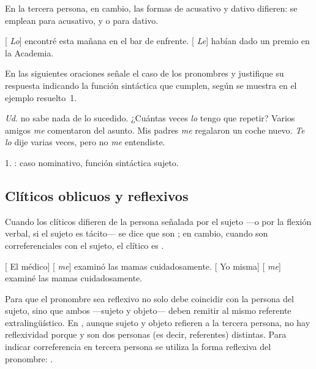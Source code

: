 En la tercera persona, en cambio, las formas de acusativo y dativo difieren: se
emplean  para acusativo, y  o  para
dativo.

\begin{exe}
  \ex {}[ \textit{Lo}] encontré esta mañana en el bar de enfrente.
  \ex {}[ \textit{Le}] habían dado un premio en la Academia.
\end{exe}

\begin{ejercicio}\label{ej:10-caso}
En las siguientes oraciones señale el caso de los pronombres y justifique su
respuesta indicando la función sintáctica que cumplen, según se muestra en el
ejemplo resuelto~1.

\begin{exe}
  \ex \textit{Ud.} no sabe nada de lo sucedido.
  \ex ¿Cuántas veces \textit{lo} tengo que repetir?
  \ex Varios amigos \textit{me} comentaron del asunto.
  \ex Mis padres \textit{me} regalaron un coche nuevo.
  \ex \textit{Te lo} dije varias veces, pero no \textit{me} entendiste.
\end{exe}

\begin{resuelto}
1. : caso nominativo, función sintáctica sujeto.
\end{resuelto}
\end{ejercicio}

\subsection{Clíticos oblicuos y reflexivos}\label{sec:10-oblicuos}

Cuando los clíticos difieren de la persona señalada por el sujeto ---o por la
flexión verbal, si el sujeto es tácito--- se dice que son 
; en cambio, cuando son correferenciales con el sujeto, el
clítico es  .

\begin{exe}
  \ex\label{ex:10-medico} {}[ El médico] [
      \textit{me}] examinó las mamas cuidadosamente.
  \ex\label{ex:10-yomisma} {}[ Yo misma] [
      \textit{me}] examiné las mamas cuidadosamente.
\end{exe}

Para que el pronombre sea reflexivo no solo debe coincidir con la persona del
sujeto, sino que ambos ---sujeto y objeto--- deben remitir al mismo referente
extralingüístico. En , aunque sujeto y objeto refieren a
la tercera persona, no hay reflexividad porque  y  son dos personas (es decir, referentes) distintas. Para indicar
correferencia en tercera persona se utiliza la forma reflexiva del pronombre:
 .


